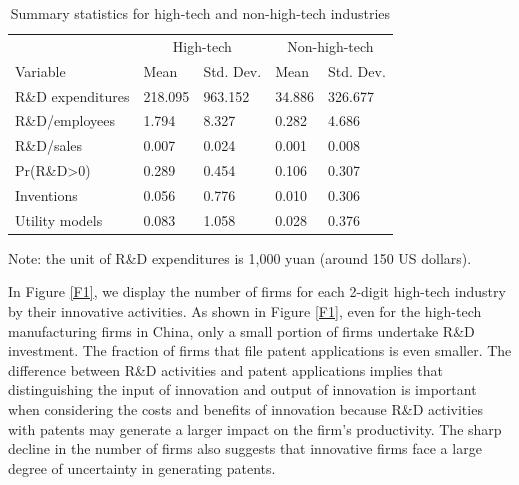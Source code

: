 \documentclass[11pt]{article}
\begin{document}
\begin{table}[h]
    \caption{Summary statistics for high-tech and non-high-tech industries}
    \label{T2}
    \begin{centering}
    \begin{tabular}{lllll}
    \toprule
     & \multicolumn{2}{c}{High-tech} & \multicolumn{2}{c}{Non-high-tech} \\ \cmidrule{2-5}
    Variable & Mean & Std. Dev. & Mean & Std. Dev.\\
    \hline
    R\&D expenditures & 218.095 & 963.152 & 34.886 & 326.677\\
    R\&D/employees & 1.794 & 8.327 & 0.282 & 4.686\\
    R\&D/sales & 0.007 & 0.024 & 0.001 & 0.008\\
    Pr(R\&D>0) &0.289 & 0.454 & 0.106 &0.307 \\
    Inventions & 0.056 & 0.776 & 0.010 & 0.306\\
    Utility models & 0.083 & 1.058 & 0.028 & 0.376\\ \bottomrule
    \end{tabular}
    \par\end{centering}
    {\small{}Note: the unit of R\&D expenditures is 1,000 yuan (around
    150 US dollars).}{\small \par}
\end{table}

In Figure \ref{F1}, we display the number of firms for each 2-digit high-tech industry
by their innovative activities. As shown in Figure \ref{F1}, even
for the high-tech manufacturing firms in China, only a small portion of firms
undertake R\&D investment. The fraction
of firms that file patent applications is even smaller. The difference
between R\&D activities and patent applications implies that distinguishing
the input of innovation and output of innovation is important when
considering the costs and benefits of innovation because R\&D activities with patents may generate a larger impact on the firm's productivity. The sharp decline in the number of firms also suggests that innovative firms face a large degree of uncertainty in generating patents. 
\end{document}
